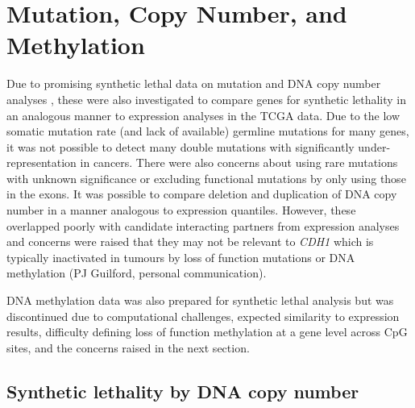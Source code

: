 
\FloatBarrier


\iffalse

\section{Mutation, Copy Number, and Methylation}

Due to promising synthetic lethal data on mutation and DNA copy number analyses \citep{Jerby2014, Lu2015}, these were also investigated to compare genes for synthetic lethality in an analogous manner to expression analyses in the TCGA data. Due to the low somatic mutation rate (and lack of available) germline mutations for many genes, it was not possible to detect many double mutations with significantly under-representation in cancers. There were also concerns about using rare mutations with unknown significance or excluding functional mutations by only using those in the exons.
It was possible to compare deletion and duplication of DNA copy number in a manner analogous to expression quantiles. However, these overlapped poorly with candidate interacting partners from expression analyses and concerns were raised that they may not be relevant to \textit{CDH1} which is typically inactivated in tumours by loss of function mutations or DNA methylation (PJ Guilford, personal communication).   

DNA methylation data was also prepared for synthetic lethal analysis but was discontinued due to computational challenges, expected similarity to expression results, difficulty defining loss of function methylation at a gene level across CpG sites, and the concerns raised in the next section. 

\subsection{Synthetic lethality by DNA copy number}


